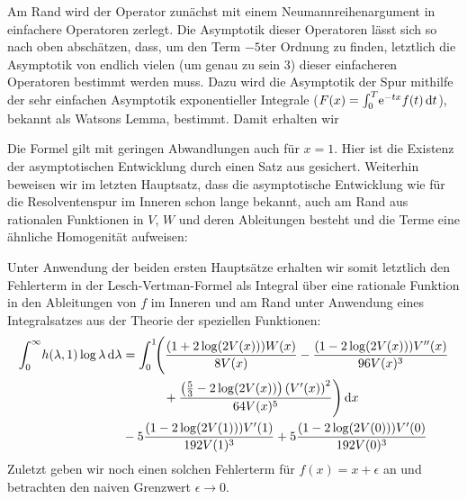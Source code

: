 Am Rand wird der Operator zunächst mit einem Neumannreihenargument in
einfachere Operatoren zerlegt. Die Asymptotik dieser Operatoren lässt sich so nach
oben abschätzen, dass, um den Term $-5$ter Ordnung zu finden, letztlich die
Asymptotik von endlich vielen (um genau zu sein 3) dieser einfacheren Operatoren
bestimmt werden muss. Dazu wird die Asymptotik der Spur mithilfe der sehr
einfachen Asymptotik exponentieller Integrale ($F(x) =
\Integ[T]{0}{t}{\Eto{-tx}f(t)}$), bekannt als Watsons Lemma, bestimmt. Damit
erhalten wir
\begin{Hauptsatz}
  
\end{Hauptsatz}
Die Formel gilt mit geringen Abwandlungen auch für $x=1$. Hier ist die Existenz
der asymptotischen Entwicklung durch einen Satz aus \cite{LV13} gesichert.
Weiterhin beweisen wir im letzten Hauptsatz, dass die asymptotische
Entwicklung wie für die Resolventenspur im Inneren schon lange bekannt, auch am
Rand aus rationalen Funktionen in $V$, $W$ und deren Ableitungen besteht und die
Terme eine ähnliche Homogenität aufweisen:
\begin{Hauptsatz}
  
\end{Hauptsatz}

Unter Anwendung der beiden ersten Hauptsätze erhalten wir somit letztlich den
Fehlerterm in der Lesch-Vertman-Formel als Integral über eine rationale Funktion
in den Ableitungen von $f$ im Inneren und am Rand unter Anwendung eines
Integralsatzes aus der Theorie der speziellen Funktionen:
\begin{align*}
  \Integ[\infty]{0}{\lambda}{
    h(\lambda, 1) \log\lambda
  }
  &=
  \Int{x}{\Biggl(\frac{(1 + 2 \log(2 V(x))) W(x)}{8 V(x)}
    - \frac{ (1 - 2 \log(2 V(x)))V''(x)}{96 V(x)^{3}} \\
    &\hphantom{=\int_0^1\Biggl(}\mathbin{+} \frac{\left(\frac{5}{3} - 2\log(2
    V(x))\right)\left(V'(x)\right)^{2}}{64 V(x)^{5}}\Biggr) } \\
&\mathbin- 5\frac{(1 - 2\log(2 V(1)))V'(1)}{192 V(1)^3}
+ 5\frac{(1 - 2 \log(2 V(0)))V'(0)}{192 V(0)^3}
\end{align*}
Zuletzt geben wir noch einen solchen Fehlerterm für $f(x) = x + \epsilon$ an und
betrachten den naiven Grenzwert $\epsilon \to 0$.
